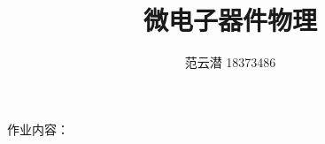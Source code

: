 \documentclass[lang=cn,11pt,a4paper,cite=authoryear]{elegantpaper}
\title{微电子器件物理\quad第一周作业}
\author{范云潜 18373486}
\institute{微电子学院 184111 班}
\date{\zhtoday}
\begin{document}
\maketitle

作业内容：

\tableofcontents


\end{document}
